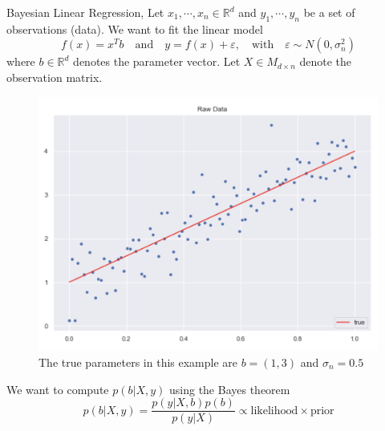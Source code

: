 \documentclass[10pt]{beamer}
\begin{document}
\begin{frame}{Bayesian Linear Regression}{\cite{reg_bayesian_regression_2019}, \cite[Chapter 2.1]{RW05}}
Let $x_1, \cdots, x_n \in \mathbb{R}^d$ and $y_1, \cdots, y_n$ be a set of observations (data). We want to fit the linear model 
$$
f(x) = x^T b \quad \text{and} \quad y = f(x) + \varepsilon, \quad \text{with} \quad \varepsilon \sim N(0, \sigma_n^2)
$$
where $b \in \mathbb{R}^d$ denotes the parameter vector. Let $X \in M_{d \times n}$ denote the observation matrix. 
\begin{center}
\begin{figure}
\includegraphics[scale=0.14]{images/lin_raw_data.png} 
\caption{The true parameters in this example are $b=(1, 3)$ and $\sigma_n=0.5$}
\end{figure}
\pause
\end{center}
We want to compute $p(b|X, y)$ using the Bayes theorem 
$$
p(b|X, y) = \frac{p(y|X, b) p(b)}{p(y|X) } \propto \text{likelihood} \times \text{prior}
$$
\end{frame}
\end{document}
